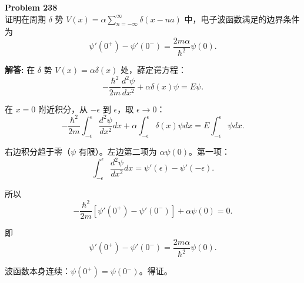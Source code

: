 \documentclass[12pt, a4paper, oneside]{ctexart}
\newenvironment{solution}{\par\noindent\textbf{解答:}\quad}{\par}
\begin{document}
\begin{mdframed}[backgroundcolor=gray!10, linewidth=0pt]
    \textbf{Problem 238} \\
    证明在周期 $\delta$ 势 $V(x) = \alpha \sum_{n=-\infty}^\infty \delta(x - n a)$ 中，电子波函数满足的边界条件为
    \[
    \psi'(0^+) - \psi'(0^-) = \frac{2m\alpha}{\hbar^2} \psi(0).
    \]
\end{mdframed}
\begin{solution}
    在 $\delta$ 势 $V(x) = \alpha \delta(x)$ 处，薛定谔方程：
    \[
    -\frac{\hbar^2}{2m} \frac{d^2 \psi}{dx^2} + \alpha \delta(x) \psi = E \psi.
    \]
    
    在 $x=0$ 附近积分，从 $-\epsilon$ 到 $\epsilon$，取 $\epsilon \to 0$：
    \[
    -\frac{\hbar^2}{2m} \int_{-\epsilon}^\epsilon \frac{d^2 \psi}{dx^2} dx + \alpha \int_{-\epsilon}^\epsilon \delta(x) \psi dx = E \int_{-\epsilon}^\epsilon \psi dx.
    \]
    
    右边积分趋于零（$\psi$ 有限）。左边第二项为 $\alpha \psi(0)$。第一项：
    \[
    \int_{-\epsilon}^\epsilon \frac{d^2 \psi}{dx^2} dx = \psi'(\epsilon) - \psi'(-\epsilon).
    \]
    
    所以
    \[
    -\frac{\hbar^2}{2m} [\psi'(0^+) - \psi'(0^-)] + \alpha \psi(0) = 0.
    \]
    
    即
    \[
    \psi'(0^+) - \psi'(0^-) = \frac{2m\alpha}{\hbar^2} \psi(0).
    \]
    
    波函数本身连续：$\psi(0^+) = \psi(0^-)$。得证。
\end{solution}
\end{document}
